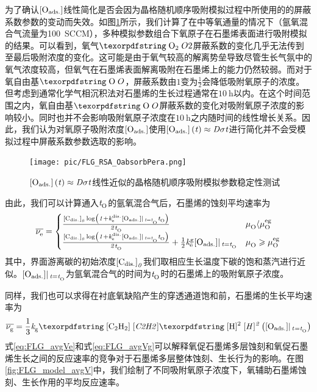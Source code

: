 为了确认$\rm{\left[O_{ads.}\right]} \it$线性简化是否会因为晶格随机顺序吸附模拟过程中所使用的的屏蔽系数参数的变动而失效。如图\ref{fig:FLG_RSA_OabsorbPera}所示，我们计算了在中等氧通量的情况下（氩氧混合气流量为\SI{100}{SCCM}），多种模拟参数组合下氧原子在石墨烯表面进行吸附模拟的结果。可以看到，氧气$\cemb{O2}$屏蔽系数的变化几乎无法传到至最后吸附浓度的变化。这可能是由于氧气较高的解离势垒导致尽管生长气氛中的氧气浓度较高，但氧气在石墨烯表面解离吸附在石墨烯上的能力仍然较弱。而对于氧自由基$\cemb{O}$，屏蔽系数由$1$变为$\frac{1}{2}$会降低吸附氧原子的浓度。但考虑到通常化学气相沉积法对石墨烯的生长过程通常在$\SI{10}{\hour}$以内。在这个时间范围之内，氧自由基$\cemb{O}$屏蔽系数的变化对吸附氧原子浓度的影响较小。同时也并不会影响吸附氧原子浓度在$\SI{10}{\hour}$之内随时间的线性增长关系。因此，我们认为对氧原子吸附浓度$\rm{\left[O_{ads.}\right]} \it$使用$\rm{\left[O_{ads.}\right]} \it\left(\it t\right)\approx \it D \sigma t$进行简化并不会受模拟过程中屏蔽系数参数选取的影响。

\begin{figure}[htb]
    \texttt{[image: pic/FLG\_RSA\_OabsorbPera.png]}
    \caption{$\rm{\left[O_{ads.}\right]} \it\left(\it t\right)\approx \it D \sigma t$线性近似的晶格随机顺序吸附模拟参数稳定性测试}
    \label{fig:FLG_RSA_OabsorbPera}
\end{figure}

由此，我们可以计算通入$\it{t_{\rm O}^{\rm }} \it$的氩氧混合气后，石墨烯的蚀刻平均速率为\chinesecolon
\begin{equation}
    \label{eq:FLG_avgVe}
    \overline{\it \nu_{\rm e}^{\rm } \it}=
    \begin{cases}
        \frac{\rm{\left[C_{dis.}\right]} \it_0 \log\left( 1+\it{k_{\rm e}^{\rm dis.}} \it\rm{\left[O_{ads.}\right]} \it | \,_{t=\it{t_{\rm O}^{\rm }} \it} \it{t_{\rm O}^{\rm }} \it \right) }{\it 2 \it{t_{\rm O}^{\rm }} \it}                                                        & \it \mu_{\rm O}^{\rm } \it \langle \it \mu_{\rm O}^{\rm eg} \it         \\
        \frac{\rm{\left[C_{dis.}\right]} \it_0 \log\left( 1+\it{k_{\rm e}^{\rm dis.}} \it\rm{\left[O_{ads.}\right]} \it | \,_{t=\it{t_{\rm O}^{\rm }} \it} \it{t_{\rm O}^{\rm }} \it \right) }{\it 2 \it{t_{\rm O}^{\rm }} \it} + \frac{1}{2}\it{k_{\rm e}^{\rm g}} \it\rm{\left[O_{ads.}\right]} \it| \,_{t=\it{t_{\rm O}^{\rm }} \it} & \it \mu_{\rm O}^{\rm } \it \geqslant \it \mu_{\rm O}^{\rm eg} \it
    \end{cases}
\end{equation}
其中，界面游离碳的初始浓度$\rm{\left[C_{dis.}\right]} \it_0$我们取相应生长温度下碳的饱和蒸汽进行近似。$\rm{\left[O_{ads.}\right]} \it| \,_{t=\it{t_{\rm O}^{\rm }} \it}$为氩氧混合气的时间为$\it{t_{\rm O}^{\rm }} \it$时的石墨烯上的吸附氧原子浓度。

同样，我们也可以求得在衬底氧缺陷产生的穿透通道饱和前，石墨烯的生长平均速率为\chinesecolon
\begin{equation}
    \label{eq:FLG_avgVg}
    \overline{\RateV{g}{}} =\frac{1}{3}\RateK{g}{}\cemb{[C2H2]}\cemb{[H]^2}\left(\Oads |_{\,\ReactTime{}{}=\ReactTime{O}{}} \right)
\end{equation}
式\ref{eq:FLG_avgVe}和式\ref{eq:FLG_avgVg}可以解释氧促石墨烯多层蚀刻和氧促石墨烯生长之间的反应速率的竞争对于石墨烯多层整体蚀刻、生长行为的影响。在图\ref{fig:FLG_model_avgV}中，我们绘制了不同吸附氧原子浓度下，氧辅助石墨烯蚀刻、生长作用的平均反应速率。

